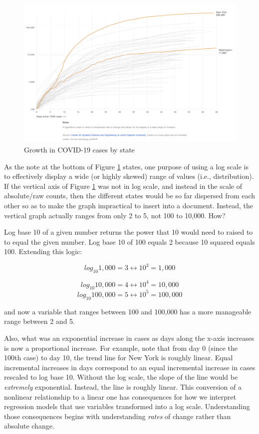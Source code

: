 \documentclass[
]{book}
\begin{document}
\begin{figure}

{\centering \includegraphics[width=\textwidth]{images/logs_covid} 

}

\caption{Growth in COVID-19 cases by state}\label{fig:logcovid}
\end{figure}

As the note at the bottom of Figure \ref{fig:logcovid} states, one purpose of using a log scale is to effectively display a wide (or highly skewed) range of values (i.e., distribution). If the vertical axis of Figure \ref{fig:logcovid} was not in log scale, and instead in the scale of absolute/raw counts, then the different states would be so far dispersed from each other so as to make the graph impractical to insert into a document. Instead, the vertical graph actually ranges from only 2 to 5, not 100 to 10,000. How?

Log base 10 of a given number returns the power that 10 would need to raised to to equal the given number. Log base 10 of 100 equals 2 because 10 squared equals 100. Extending this logic:

\[log_{10}1,000=3 \leftrightarrow 10^3=1,000\]

\[log_{10}10,000=4 \leftrightarrow 10^4=10,000\]
\[log_{10}100,000=5 \leftrightarrow 10^5=100,000\]

and now a variable that ranges between 100 and 100,000 has a more manageable range between 2 and 5.

Also, what was an exponential increase in cases as days along the x-axis increases is now a proportional increase. For example, note that from day 0 (since the 100th case) to day 10, the trend line for New York is roughly linear. Equal incremental increases in days correspond to an equal incremental increase in cases rescaled to log base 10. Without the log scale, the slope of the line would be \emph{extremely} exponential. Instead, the line is roughly linear. This conversion of a nonlinear relationship to a linear one has consequences for how we interpret regression models that use variables transformed into a log scale. Understanding those consequences begins with understanding \emph{rates} of change rather than absolute change.
\end{document}

